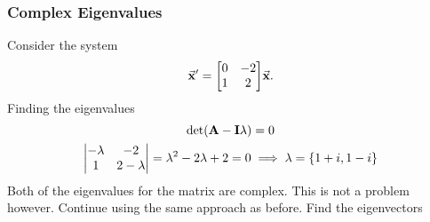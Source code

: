 \documentclass[../notes.tex]{subfiles}
\begin{document}
\subsubsection{Complex Eigenvalues}
{
\newcommand{\eigone}{1+i}
\newcommand{\eigtwo}{1-i}
\newcommand{\vectorone}{\mqty[-1+i \\ 1]}
\newcommand{\vectortwo}{\mqty[-1-i \\ 1]}

Consider the system
\[
	\va{x}' = \mqty[0 & -2 \\ 1 & 2] \va{x}
.\]
Finding the eigenvalues
\begin{gather*}
	\det(\vb{A} - \vb{I}\lambda) = 0 \\
	\mdet{
	- \lambda & -2 \\
	1 & 2 - \lambda
	} =
	\lambda ^2-2 \lambda +2 = 0 \implies \lambda = \{1+i, 1-i\}
\end{gather*}
Both of the eigenvalues for the matrix are complex. This is not a problem however. Continue using the same approach as before. Find the eigenvectors

}
\end{document}
